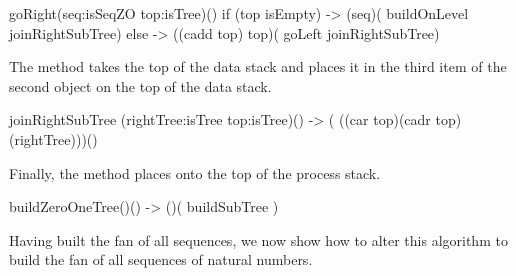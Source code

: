 \starttyping
\startJoylolCode
goRight(seq:isSeqZO top:isTree)() {
  if (top isEmpty) {
    -> (seq)( buildOnLevel joinRightSubTree)
  } else {
    -> ((cadd top) top)( goLeft joinRightSubTree)
  }
}
\stopJoylolCode
\stoptyping

\item The  method takes the top of the data stack 
and places it in the third item of the second object on the top of the 
data stack. 

\starttyping
\startJoylolCode
joinRightSubTree (rightTree:isTree top:isTree)()
-> ( ((car top)(cadr top)(rightTree)))()
\stopJoylolCode
\stoptyping

\item Finally, the  method places 
 onto the top of the process stack. 

\starttyping
\startJoylolCode
buildZeroOneTree()() -> ()( buildSubTree )
\stopJoylolCode
\stoptyping

\stopitemize

Having built the fan of all  sequences, we now show how to 
alter this algorithm to build the fan of all sequences of natural numbers. 


